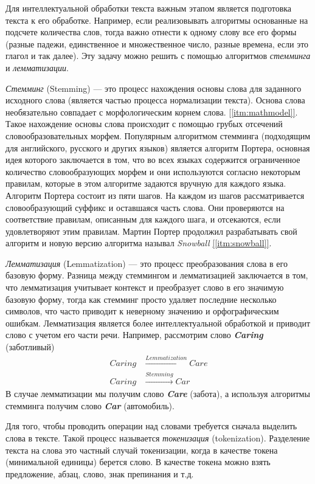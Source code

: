 Для интеллектуальной обработки текста важным этапом является подготовка текста к его обработке. Например, если реализовывать алгоритмы основанные на подсчете количества слов, тогда важно отнести к одному слову все его формы (разные падежи, единственное и множественное число, разные времена, если это глагол и так далее). Эту задачу можно решить с помощью алгоритмов \textit{стемминга} и \textit{лемматизации}.

\textit{Стемминг} (Stemming) --- это процесс нахождения основы слова для заданного исходного слова (является частью процесса нормализации текста).
Основа слова необязательно совпадает с морфологическим корнем слова. \hyperref[itm:mathmodel]{[\ref{itm:mathmodel}]}. Такое нахождение основы слова происходит с помощью грубых отсечений словообразовательных морфем. Популярным алгоритмом стемминга (подходящим для английского, русского и других языков) является алгоритм Портера, основная идея которого заключается в том, что во всех языках содержится ограниченное количество словообразующих морфем и они используются согласно некоторым правилам, которые в этом алгоритме задаются вручную для каждого языка. Алгоритм Портера состоит из пяти шагов. На каждом из шагов рассматривается словообразующий суффикс и оставшаяся часть слова. Они проверяются на соответствие правилам, описанным для каждого шага, и отсекаются, если удовлетворяют этим правилам. Мартин Портер продолжил разрабатывать свой алгоритм и новую версию алгоритма называл \textit{Snowball} \hyperref[itm:snowball]{[\ref{itm:snowball}]}.


\textit{Лемматизация} (Lemmatization) --- это процесс преобразования слова в его базовую форму. Разница между стеммингом и лемматизацией заключается в том, что лемматизация учитывает контекст и преобразует слово в его значимую базовую форму, тогда как стемминг просто удаляет последние несколько символов, что часто приводит к неверному значению и орфографическим ошибкам. Лемматизация является более интеллектуальной обработкой и приводит слово с учетом его части речи. Например, рассмотрим слово \textbf{\textit{Caring}} (заботливый)
\begin{align*}
Caring &\xrightarrow{Lemmatization} Care \\
Caring &\xrightarrow{Stemming} Car
\end{align*} 
В случае лемматизации мы получим слово \textbf{\textit{Care}} (забота), а используя алгоритмы стемминга получим слово \textbf{\textit{Car}} (автомобиль).

Для того, чтобы проводить операции над словами требуется сначала выделить слова в тексте. Такой процесс называется \textit{токенизация} (tokenization). Разделение текста на слова это частный случай токенизации, когда в качестве токена (минимальной единицы) берется слово. В качестве токена можно взять предложение, абзац, слово, знак препинания и т.д. 

